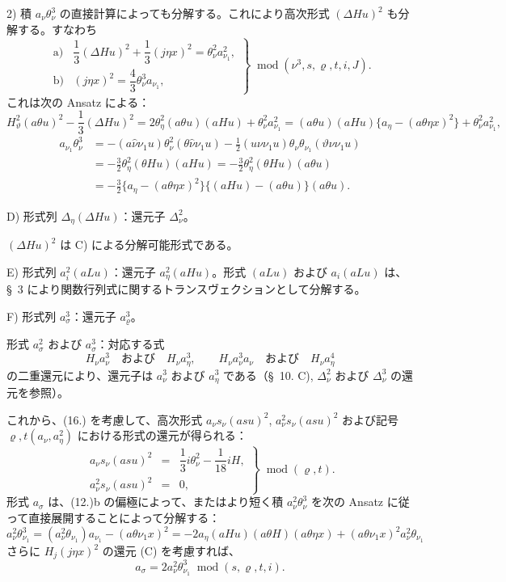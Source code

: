 \documentclass[11pt]{article}
\newcommand{\A}{\Delta}
\newcommand{\R}{\varrho}
\newcommand{\modu}[1]{\;\operatorname{mod} #1}
\begin{document}
2) 積 $a_\nu\theta_\nu^3$ の直接計算によっても分解する。これにより高次形式 $(\A Hu)^2$ も分解する。すなわち
\[
\tag{18}
\left.\begin{array}{ll}
\text{a)}&\dfrac13(\A Hu)^2+\dfrac13(j\eta x)^2=\theta_\nu^2a_{\nu_1}^2,\\[0.6em]
\text{b)}&(j\eta x)^2=\dfrac43\theta_\nu^3a_{\nu_1},
\end{array}\right\}\modu{(\nu^3,s,\R,t,i,J)}.
\]
これは次の Ansatz による：
\[
H_\vartheta^2(a\theta u)^2-\frac13(\A Hu)^2
=2\theta_\eta^2(a\theta u)(aHu)+\theta_\nu^2a_{\nu_1}^2
=(a\theta u)(aHu)\{a_\eta-(a\theta\eta x)^2\}+\theta_\nu^2a_{\nu_1}^2,
\]
\[
\begin{aligned}
a_{\nu_1}\theta_\nu^3
&=-(a\widehat{\nu}\nu_1u)\theta_\nu^2(\theta\widehat{\nu}\nu_1u)
-\frac12(u\nu\nu_1u)\theta_\nu\theta_{\nu_1}(\vartheta\nu\nu_1u)\\
&=-\frac32\theta_\eta^2(\theta Hu)(aHu)
=-\frac32\theta_\eta^2(\theta Hu)(a\theta u)\\
&=-\frac32\{a_\eta-(a\theta\eta x)^2\}\{(aHu)-(a\theta u)\}(a\theta u).
\end{aligned}
\]

\noindent D) 形式列 $\A_\eta(\A Hu)$：還元子 $\A_\nu^2$。

$(\A Hu)^2$ は C) による分解可能形式である。

\noindent E) 形式列 $a_i^2(aLu)$：還元子 $a_\eta^2(aHu)$。形式 $(aLu)$ および $a_i(aLu)$ は、\S\ 3 により関数行列式に関するトランスヴェクションとして分解する。

\noindent F) 形式列 $a_\sigma^3$：還元子 $a_\R^3$。

形式 $a_\sigma^2$ および $a_\sigma^3$：対応する式
\[
H_\nu a_\nu^3\quad\text{および}\quad H_\nu a_\eta^3,
\qquad
H_\nu a_\nu^3a_\nu\quad\text{および}\quad H_\nu a_\eta^4
\]
の二重還元により、還元子は $a_\nu^3$ および $a_\eta^3$ である（\S\ 10. C), $\A_\nu^2$ および $\A_\nu^3$ の還元を参照）。

これから、(16.) を考慮して、高次形式 $a_\nu s_\nu(asu)^2$, $a_\nu^2s_\nu(asu)^2$ および記号 $\R,t(a_\nu,a_\eta^2)$ における形式の還元が得られる：
\[
\tag{19}
\left.\begin{array}{rcl}
a_\nu s_\nu(asu)^2&=&\dfrac13 i\theta_\nu^2-\dfrac1{18}iH,\\[0.5em]
a_\nu^2s_\nu(asu)^2&=&0,
\end{array}\right\}\modu{(\R,t)}.
\]
形式 $a_\sigma$ は、(12.)b の偏極によって、またはより短く積 $a_\nu^2\theta_\nu^3$ を次の Ansatz に従って直接展開することによって分解する：
\[
a_\nu^2\theta_{\nu_1}^3=(a_\nu^2\theta_{\nu_1})a_{\nu_1}-(a\theta\nu_1x)^2
=-2a_\eta(aHu)(a\theta H)(a\theta\eta x)+(a\theta\nu_1x)^2a_\nu^2\theta_{\nu_1}
\]
さらに $H_j(j\eta x)^2$ の還元 (C) を考慮すれば、
\[
\tag{20}a_\sigma=2a_\nu^2\theta_{\nu_1}^3\modu{(s,\R,t,i)}.
\]
\end{document}
